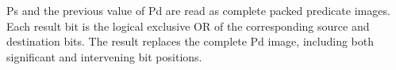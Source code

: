 Ps and the previous value of Pd are read as complete packed predicate images.
Each result bit is the logical exclusive OR of the corresponding source and
destination bits.  The result replaces the complete Pd image, including both
significant and intervening bit positions.
